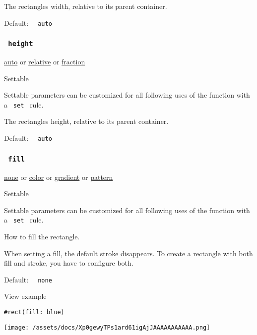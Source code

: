 The rectangle\textquotesingle s width, relative to its parent container.

Default: \texttt{\ }{\texttt{\ auto\ }}\texttt{\ }

\subsubsection{\texorpdfstring{\texttt{\ height\ }}{ height }}\label{parameters-height}

\href{/docs/reference/foundations/auto/}{auto} {or}
\href{/docs/reference/layout/relative/}{relative} {or}
\href{/docs/reference/layout/fraction/}{fraction}

{{ Settable }}

\label{parameters-height-settable-tooltip}
Settable parameters can be customized for all following uses of the
function with a \texttt{\ set\ } rule.

The rectangle\textquotesingle s height, relative to its parent
container.

Default: \texttt{\ }{\texttt{\ auto\ }}\texttt{\ }

\subsubsection{\texorpdfstring{\texttt{\ fill\ }}{ fill }}\label{parameters-fill}

\href{/docs/reference/foundations/none/}{none} {or}
\href{/docs/reference/visualize/color/}{color} {or}
\href{/docs/reference/visualize/gradient/}{gradient} {or}
\href{/docs/reference/visualize/pattern/}{pattern}

{{ Settable }}

\label{parameters-fill-settable-tooltip}
Settable parameters can be customized for all following uses of the
function with a \texttt{\ set\ } rule.

How to fill the rectangle.

When setting a fill, the default stroke disappears. To create a
rectangle with both fill and stroke, you have to configure both.

Default: \texttt{\ }{\texttt{\ none\ }}\texttt{\ }


View example

\begin{verbatim}
#rect(fill: blue)
\end{verbatim}

\texttt{[image: /assets/docs/Xp0gewyTPs1ard61igAjJAAAAAAAAAAA.png]}

